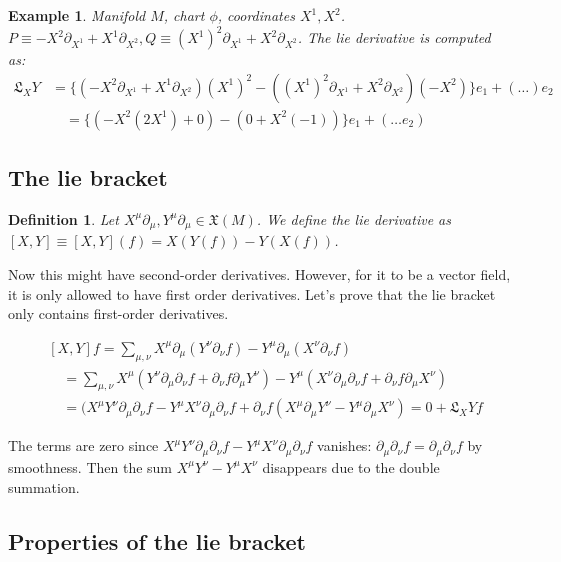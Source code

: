 \documentclass[11pt]{book}
\newcommand{\Lie}{\ensuremath{\mathfrak{L}}}
\newtheorem{definition}[theorem]{Definition}
\newtheorem{example}[theorem]{Example}
\begin{document}
\begin{example}
Manifold $M$, chart $\phi$, coordinates $X^1, X^2$.
$P \equiv  -X^2 \partial_{X^1} + X^1 \partial_{X^2}, Q \equiv (X^1)^2 \partial_{X^1} + X^2 \partial_{X^2}$. The lie derivative
is computed as:
\begin{align*}
\Lie_X Y &= \{ (-X^2 \partial_{X^1} + X^1 \partial_{X^2})(X^1)^2 - ((X^1)^2 \partial_{X^1} + X^2 \partial_{X^2})(-X^2) \} e_1 + (\dots)e_2 \\
&\quad = \{ (-X^2 (2X^1) + 0) - (0 + X^2 (-1)) \} e_1 + (\dots e_2)
\end{align*}
\end{example}

\subsection{The lie bracket}
\begin{definition}
Let $X^\mu \partial_\mu, Y^\mu \partial_\mu \in \mathfrak{X}(M)$. We define
the lie derivative as $[X, Y] \equiv [X, Y](f) = X(Y(f)) - Y(X(f))$. 
\end{definition}
Now this
might have second-order derivatives. However, for it to be a vector field,
it is only allowed to have first order derivatives. 
Let's prove that the lie bracket only contains first-order derivatives.

\begin{align*}
&[X, Y]f 
    = \sum_{\mu, \nu} X^\mu \partial_\mu (Y^\nu \partial_\nu f) - Y^\mu \partial_\mu (X^\nu \partial_\nu f)
\\ &\quad = \sum_{\mu, \nu} X^\mu (Y^\nu \partial_\mu \partial_\nu f + \partial_\nu f \partial_\mu Y^\nu)
         - Y^\mu (X^\nu \partial_\mu \partial_\nu f + \partial_\nu f \partial_\mu X^\nu)
%
\\ &\quad = (X^\mu Y^\nu \partial_\mu \partial_\nu f - Y^\mu X^\nu \partial_\mu \partial_\nu f + 
    \partial_\nu f (X^\mu \partial_\mu Y^\nu - Y^\mu  \partial_\mu X^\nu)
% 
= 0 + \Lie_X Y f             
\end{align*}

The terms are zero since $X^\mu Y^\nu \partial_\mu \partial_\nu f - Y^\mu X^\nu  \partial_\mu \partial_\nu f$
vanishes: $ \partial_\mu \partial_\nu f =  \partial_\mu \partial_\nu f$ by smoothness. Then the sum 
$X^\mu Y^\nu - Y^\mu X^\nu$ disappears due to the double summation.

\subsection{Properties of the lie bracket}
\end{document}
